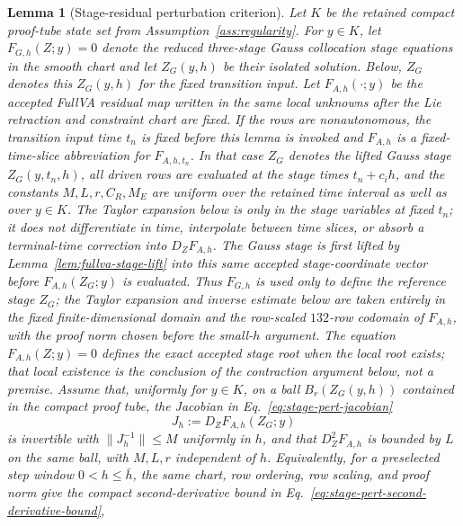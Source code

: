 \documentclass[preprint,12pt]{elsarticle}
\newtheorem{lemma}{Lemma}
\begin{document}
\begin{lemma}[Stage-residual perturbation criterion]
\label{lem:stage-residual-defect}
Let \(K\) be the retained compact proof-tube state set from
Assumption~\ref{ass:regularity}.  For \(y\in K\), let
$F_{G,h}(Z;y)=0$ denote the reduced three-stage Gauss collocation stage
equations in the smooth chart and let $Z_G(y,h)$ be their isolated solution.
Below, \(Z_G\) denotes this \(Z_G(y,h)\) for the fixed transition input.
Let \(F_{A,h}(\cdot;y)\) be the accepted FullVA residual map written in the
same local unknowns after the Lie retraction and constraint chart are fixed.
If the rows are nonautonomous, the transition input time \(t_n\) is fixed
before this lemma is invoked and \(F_{A,h}\) is a fixed-time-slice
abbreviation for \(F_{A,h,t_n}\).  In that case \(Z_G\) denotes the lifted
Gauss stage \(Z_G(y,t_n,h)\), all driven rows are evaluated at the stage
times \(t_n+c_i h\), and the constants \(M,L,r,C_R,M_E\) are uniform over the
retained time interval as well as over \(y\in K\).  The Taylor expansion below
is only in the stage variables at fixed \(t_n\); it does not differentiate in
time, interpolate between time slices, or absorb a terminal-time correction
into \(D_ZF_{A,h}\).
The Gauss stage is first lifted by Lemma~\ref{lem:fullva-stage-lift} into this
same accepted stage-coordinate vector before \(F_{A,h}(Z_G;y)\) is evaluated.
Thus \(F_{G,h}\) is used only to define the reference stage \(Z_G\); the
Taylor expansion and inverse estimate below are taken entirely in the fixed
finite-dimensional domain and the row-scaled \(132\)-row codomain of
\(F_{A,h}\), with the proof norm chosen before the small-\(h\) argument.
The equation \(F_{A,h}(Z;y)=0\) defines the exact accepted stage root when the
local root exists; that local existence is the conclusion of the contraction
argument below, not a premise. Assume that, uniformly for \(y\in K\), on a
ball $B_r(Z_G(y,h))$ contained in the compact proof tube, the Jacobian in
Eq.~\eqref{eq:stage-pert-jacobian}
\begin{equation}
\label{eq:stage-pert-jacobian}
  J_h:=D_ZF_{A,h}(Z_G;y)
\end{equation}
is invertible with $\|J_h^{-1}\|\le M$ uniformly in $h$, and that
$D_Z^2F_{A,h}$ is bounded by $L$ on the same ball, with $M,L,r$ independent
of $h$.  Equivalently, for a preselected step window \(0<h\le \bar h\),
the same chart, row ordering, row scaling, and proof norm give the compact
second-derivative bound in Eq.~\eqref{eq:stage-pert-second-derivative-bound},
\begin{equation}

\end{equation}
\end{lemma}
\end{document}
